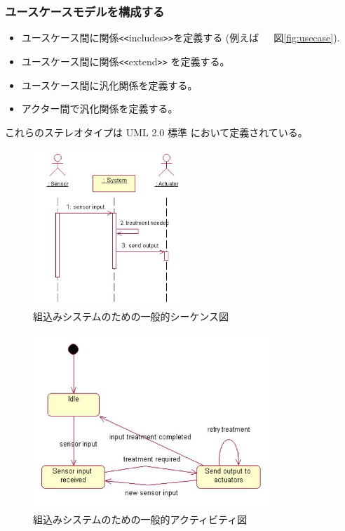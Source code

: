 \documentclass[\pformat,12pt]{jreport}
\begin{document}
\subsubsection{ユースケースモデルを構成する}

\begin{itemize}
\item ユースケース間に関係{\tt <<}includes{\tt >>}を定義する
(例えば　\ 図\ref{fig:usecase}).
\item ユースケース間に関係{\tt <<}extend{\tt >>} を定義する。
\item ユースケース間に汎化関係を定義する。
\item アクター間で汎化関係を定義する。
\end{itemize}

これらのステレオタイプは UML 2.0 標準 \cite{UML20}において定義されている。

\begin{figure}
\begin{center}
\includegraphics[width=0.5\textwidth]{generalseqdia2}
\end{center}
\caption{組込みシステムのための一般的シーケンス図}\label{fig:seqdiag}
\end{figure}

\begin{figure}
\begin{center}
\includegraphics[width=0.8\textwidth]{generalstatedia}
\end{center}
\caption{組込みシステムのための一般的アクティビティ図}\label{fig:activitydiag}
\end{figure}
\end{document}
